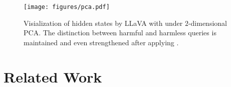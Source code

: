\begin{figure}[t]
    \centering
    \texttt{[image: figures/pca.pdf]}
    \caption{Visialization of hidden states by LLaVA with \MODEL under $2$-dimensional PCA. The distinction between harmful and harmless queries is maintained and even strengthened after applying \MODEL.}
    \label{fig:PCA}
\end{figure}

\section{Related Work}






